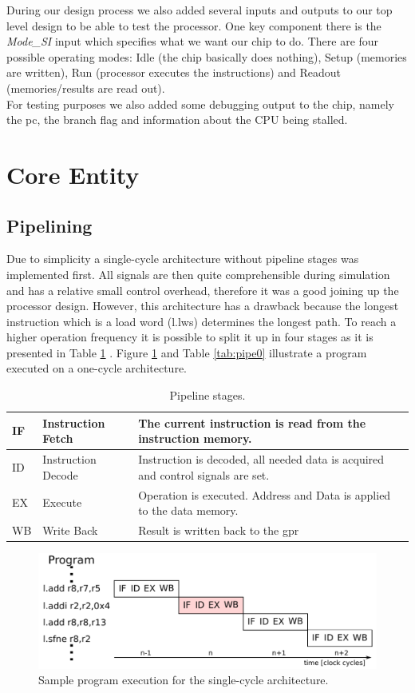 During our design process we also added several inputs and outputs to our top level design to be able to test the processor. One key component there is the \textit{Mode\_SI} input which specifies what we want our chip to do. There are four possible operating modes: Idle (the chip basically does nothing), Setup (memories are written), Run (processor executes the instructions) and Readout (memories/results are read out).\\
For testing purposes we also added some debugging output to the chip, namely the \gls{pc}, the branch flag and information about the CPU being stalled.


\section{Core Entity}
\subsection{Pipelining}
\label{sec:pipe}
Due to simplicity a single-cycle architecture without pipeline stages was implemented first. All signals are then quite comprehensible during simulation and has a relative small control overhead, therefore it was a good joining up the processor design. However, this architecture has a drawback because the longest instruction which is a load word (l.lws) determines the longest path. To reach a higher operation frequency it is possible to split it up in four stages as it is presented in Table \ref{tab:pipelines} . Figure \ref{fig:pipe0} and Table \ref{tab:pipe0} illustrate a program executed on a one-cycle architecture.
 
\begin{table}[htbp]
 \caption{Pipeline stages.}
 \label{tab:pipelines}
\centering\begin{tabular}{|l|l|p{9.5cm}|} \hline
IF & Instruction Fetch & The current instruction is read from the instruction memory. \\ \hline
ID & Instruction Decode & Instruction is decoded, all needed data is acquired and control signals are set. \\ \hline
EX & Execute & Operation is executed. Address and Data is applied to the data memory. \\ \hline
WB & Write Back & Result is written back to the \gls{gpr} \\ \hline
\end{tabular}
\end{table}

\begin{figure}[htbp]
  \centering
  \includegraphics[scale=0.8]{./figures/pipeline0}
  \caption{Sample program execution for the single-cycle architecture.}
  \label{fig:pipe0}
\end{figure}

